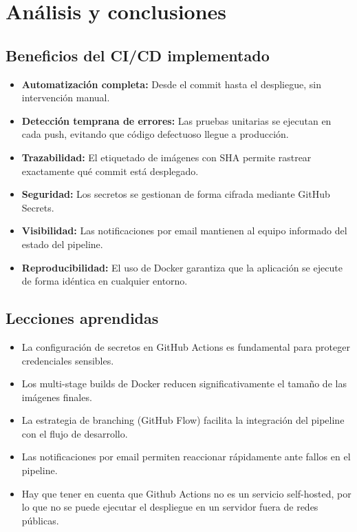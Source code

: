 \documentclass[12pt,a4paper]{article}
\begin{document}
\section{Análisis y conclusiones}

\subsection{Beneficios del CI/CD implementado}
\begin{itemize}
    \item \textbf{Automatización completa:} Desde el commit hasta el despliegue, sin intervención manual.
    \item \textbf{Detección temprana de errores:} Las pruebas unitarias se ejecutan en cada push, evitando que código defectuoso llegue a producción.
    \item \textbf{Trazabilidad:} El etiquetado de imágenes con SHA permite rastrear exactamente qué commit está desplegado.
    \item \textbf{Seguridad:} Los secretos se gestionan de forma cifrada mediante GitHub Secrets.
    \item \textbf{Visibilidad:} Las notificaciones por email mantienen al equipo informado del estado del pipeline.
    \item \textbf{Reproducibilidad:} El uso de Docker garantiza que la aplicación se ejecute de forma idéntica en cualquier entorno.
\end{itemize}

\subsection{Lecciones aprendidas}
\begin{itemize}
    \item La configuración de secretos en GitHub Actions es fundamental para proteger credenciales sensibles.
    \item Los multi-stage builds de Docker reducen significativamente el tamaño de las imágenes finales.
    \item La estrategia de branching (GitHub Flow) facilita la integración del pipeline con el flujo de desarrollo.
    \item Las notificaciones por email permiten reaccionar rápidamente ante fallos en el pipeline.
    \item Hay que tener en cuenta que Github Actions no es un servicio self-hosted, por lo que no se puede ejecutar el despliegue en un servidor fuera de redes públicas.
\end{itemize}
\end{document}
